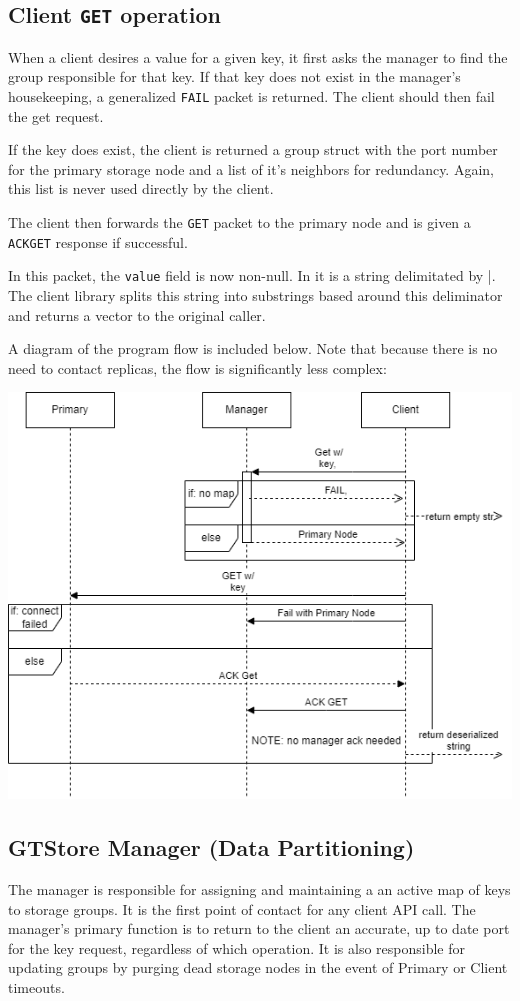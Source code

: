 \documentclass{article}
\begin{document}
\pagebreak
\subsection{Client \texttt{GET} operation}
When a client desires a value for a given key, it first asks the manager to find the group responsible for that key.
If that key does not exist in the manager's housekeeping, a generalized \texttt{FAIL} packet is returned. The client should then fail the get request.

If the key does exist, the client is returned a group struct with the port number for the primary storage node and a list of it's neighbors for redundancy. 
Again, this list is never used directly by the client.

The client then forwards the \texttt{GET} packet to the primary node and is given a \texttt{ACKGET} response if successful.

In this packet, the \texttt{value} field is now non-null. 
In it is a string delimitated by |. 
The client library splits this string into substrings based around this deliminator and returns a vector to the original caller.

A diagram of the program flow is included below. Note that because there is no need to contact replicas, 
the flow is significantly less complex:\\
\begin{center}
    \includegraphics[scale=0.7]{img/Get.drawio.png}
\end{center}

\subsection{GTStore Manager (Data Partitioning)}
The manager is responsible for assigning and maintaining a an active map of keys to storage groups. It is the first point of contact for any client API call.
The manager's primary function is to return to the client an accurate, up to date port for the key request, regardless of which operation. It is also responsible for updating
groups by purging dead storage nodes in the event of Primary or Client timeouts.
\end{document}
